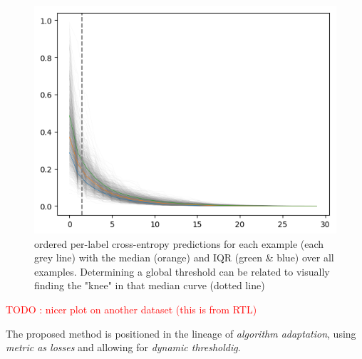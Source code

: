 \documentclass[sigconf,natbib,screen=true,review=true,anonymous]{acmart}
\newcommand\todo[1]{\textcolor{red}{TODO : #1}}
\begin{document}
\begin{figure}[htbp]
\centering
\includegraphics[width=.9\linewidth]{./images/knee.png}
\caption{\label{fig:knee}
ordered per-label cross-entropy predictions for each example (each grey line) with the median (orange) and IQR (green \& blue) over all examples. Determining a global threshold can be related to visually finding the "knee" in that median curve (dotted line)}
\end{figure}

\todo{nicer plot on another dataset (this is from RTL)}

The proposed method is positioned in the lineage of \emph{algorithm adaptation}, using \emph{metric as losses} and allowing for \emph{dynamic thresholdig}. 












\end{document}
